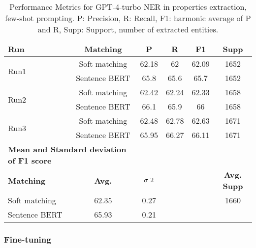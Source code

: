 \begin{table}[htbp]
\small
  \centering
  \caption{Performance Metrics for GPT-4-turbo NER in properties extraction, few-shot prompting. P: Precision, R: Recall, F1: harmonic average of P and R, Supp: Support, number of extracted entities.}
  \begin{tabular}{lccccc}
    \toprule
    \textbf{Run} & \textbf{Matching} & \textbf{P} & \textbf{R} & \textbf{F1} & \textbf{Supp} \\
    \midrule
    \multirow{2}{*}{Run1} & Soft matching & 62.18 & 62 & 62.09 & 1652 \\
    & Sentence BERT & 65.8 & 65.6 & 65.7 & 1652 \\
    \midrule    
    \multirow{2}{*}{Run2} & Soft matching & 62.42 & 62.24 & 62.33 & 1658 \\
    & Sentence BERT & 66.1 & 65.9 & 66 & 1658 \\
    \midrule    
    \multirow{2}{*}{Run3} & Soft matching & 62.48 & 62.78 & 62.63 & 1671 \\
    & Sentence BERT & 65.95 & 66.27 & 66.11 & 1671 \\
    \midrule
    \multicolumn{2}{l}{\textbf{Mean and Standard deviation of F1 score}} & & & & \\
    \midrule
    \textbf{Matching} & \textbf{Avg.} & $\sigma\textsuperscript{2}$ & & & \textbf{Avg. Supp}\\
    Soft matching & 62.35 & 0.27 & & & 1660 \\
    Sentence BERT & 65.93 & 0.21 & & & \\
    \bottomrule
  \end{tabular}
\end{table}

\clearpage
\subsubsection{Fine-tuning}

